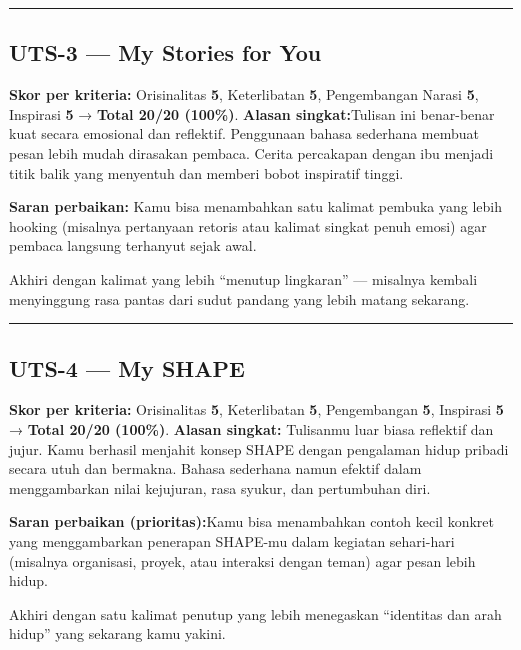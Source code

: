 \documentclass[
  letterpaper,
  DIV=11,
  numbers=noendperiod]{scrreprt}
\begin{document}
\begin{center}\rule{0.5\linewidth}{0.5pt}\end{center}

\subsection{UTS-3 --- My Stories for
You}\label{uts-3-my-stories-for-you-1}

\textbf{Skor per kriteria:} Orisinalitas \textbf{5}, Keterlibatan
\textbf{5}, Pengembangan Narasi \textbf{5}, Inspirasi \textbf{5} →
\textbf{Total 20/20 (100\%)}. \textbf{Alasan singkat:}Tulisan ini
benar-benar kuat secara emosional dan reflektif. Penggunaan bahasa
sederhana membuat pesan lebih mudah dirasakan pembaca. Cerita percakapan
dengan ibu menjadi titik balik yang menyentuh dan memberi bobot
inspiratif tinggi.

\textbf{Saran perbaikan:} Kamu bisa menambahkan satu kalimat pembuka
yang lebih hooking (misalnya pertanyaan retoris atau kalimat singkat
penuh emosi) agar pembaca langsung terhanyut sejak awal.

Akhiri dengan kalimat yang lebih ``menutup lingkaran'' --- misalnya
kembali menyinggung rasa pantas dari sudut pandang yang lebih matang
sekarang.

\begin{center}\rule{0.5\linewidth}{0.5pt}\end{center}

\subsection{UTS-4 --- My SHAPE}\label{uts-4-my-shape}

\textbf{Skor per kriteria:} Orisinalitas \textbf{5}, Keterlibatan
\textbf{5}, Pengembangan \textbf{5}, Inspirasi \textbf{5} →
\textbf{Total 20/20 (100\%)}. \textbf{Alasan singkat:} Tulisanmu luar
biasa reflektif dan jujur. Kamu berhasil menjahit konsep SHAPE dengan
pengalaman hidup pribadi secara utuh dan bermakna. Bahasa sederhana
namun efektif dalam menggambarkan nilai kejujuran, rasa syukur, dan
pertumbuhan diri.

\textbf{Saran perbaikan (prioritas):}Kamu bisa menambahkan contoh kecil
konkret yang menggambarkan penerapan SHAPE-mu dalam kegiatan sehari-hari
(misalnya organisasi, proyek, atau interaksi dengan teman) agar pesan
lebih hidup.

Akhiri dengan satu kalimat penutup yang lebih menegaskan ``identitas dan
arah hidup'' yang sekarang kamu yakini.
\end{document}
